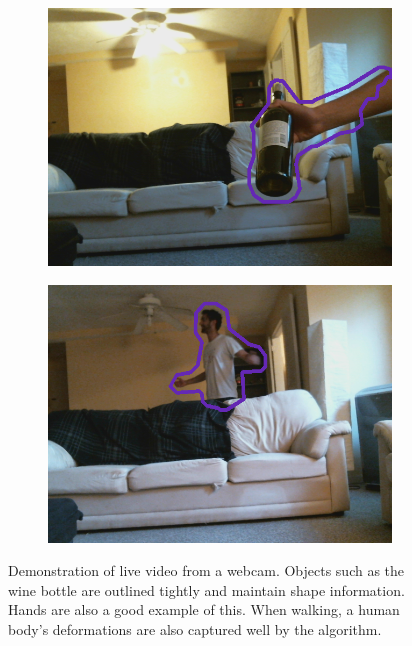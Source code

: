 \documentclass[10pt,twocolumn,letterpaper]{article}
\begin{document}
\begin{figure}
\begin{subfigure}[t]{0.23\textwidth}
        \includegraphics[width=\textwidth]{images/live_video3}
    \end{subfigure}
    \begin{subfigure}[t]{0.23\textwidth}
        \centering
        \includegraphics[width=\textwidth]{images/live_video4}
    \end{subfigure}
    \caption{Demonstration of live video from a webcam. Objects such as the wine bottle are outlined tightly and
            maintain shape information. Hands are also a good example of this. When walking, a human body's
            deformations are also captured well by the algorithm.}
    \label{fig:live_video}
\end{figure}
\end{document}
